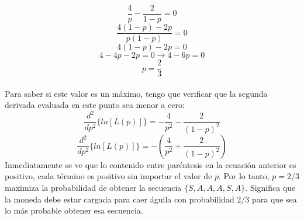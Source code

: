 \documentclass[14pt,a4paper]{report}
\begin{document}
\begin{equation}
\frac{4}{p}-\frac{2}{1-p}=0
\end{equation}
\begin{equation*}
\frac{4(1-p)-2p}{p(1-p)}=0
\end{equation*}
\begin{equation*}
4(1-p)-2p=0
\end{equation*}
\begin{equation*}
4-4p-2p=0\rightarrow 4-6p=0
\end{equation*}
\begin{equation}
p=\frac{2}{3}
\end{equation}\\
Para saber si este valor es un máximo, tengo que verificar que la segunda derivada evaluada en este punto sea menor a cero:
\begin{equation}
\frac{d^2}{dp^2}\{ln[L(p)]\}=-\frac{4}{p^2}-\frac{2}{(1-p)^2}
\end{equation}
\begin{equation}
\frac{d^2}{dp^2}\{ln[L(p)]\}=-\left(\frac{4}{p^2}+\frac{2}{(1-p)^2}\right)
\end{equation}
Inmediatamente se ve que lo contenido entre paréntesis en la ecuación anterior es positivo, cada término es positivo sin importar el valor de $p$. Por lo tanto, $p=2/3$ maximiza la probabilidad de obtener la secuencia $\{S,A,A,A,S,A\}$. Significa que la moneda debe estar cargada para caer águila con probabilidad $2/3$ para que sea lo más probable obtener esa secuencia.\\
\end{document}
